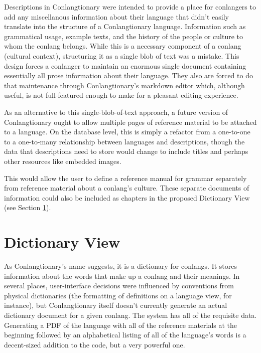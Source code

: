 Descriptions in Conlangtionary were intended to provide a place for conlangers to add any miscellanous information about their language that didn't easily translate into the structure of a Conlangtionary language. Information such as grammatical usage, example texts, and the history of the people or culture to whom the conlang belongs. While this is a necessary component of a conlang (cultural context), structuring it as a single blob of text was a mistake. This design forces a conlanger to maintain an enormous single document containing essentially all prose information about their language. They also are forced to do that maintenance through Conlangtionary's markdown editor which, although useful, is not full-featured enough to make for a pleasant editing experience.

As an alternative to this single-blob-of-text approach, a future version of Conlangtionary ought to allow multiple pages of reference material to be attached to a language. On the database level, this is simply a refactor from a one-to-one to a one-to-many relationship between languages and descriptions, though the data that descriptions need to store would change to include titles and perhaps other resources like embedded images.

This would allow the user to define a reference manual for grammar separately from reference material about a conlang's culture. These separate documents of information could also be included as chapters in the proposed Dictionary View (see Section \ref{sec:refactor-dictionary}).

\section{Dictionary View}
\label{sec:refactor-dictionary}

As Conlangtionary's name suggests, it is a dictionary for conlangs. It stores information about the words that make up a conlang and their meanings. In several places, user-interface decisions were influenced by conventions from physical dictionaries (the formatting of definitions on a language view, for instance), but Conlangtionary itself doesn't currently generate an actual dictionary document for a given conlang. The system has all of the requisite data. Generating a PDF of the language with all of the reference materials at the beginning followed by an alphabetical listing of all of the language's words is a decent-sized addition to the code, but a very powerful one.

